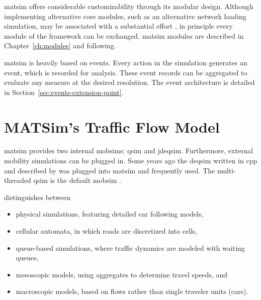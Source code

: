 \gls{matsim} offers considerable customizability through its modular design. Although %
implementing alternative core modules, such as an alternative network loading simulation, may be associated with a substantial effort \citep[][Section 2.4]{MATSim_Userguide_2015}, in principle every module of the framework can be exchanged. \gls{matsim} modules are described in Chapter~\ref{ch:modules} and following.

\gls{matsim} is heavily based on events. Every action in the simulation generates an event, which is recorded for analysis. These event records can be aggregated to evaluate any measure at the desired resolution. The event architecture is detailed in Section~\ref{sec:events-extension-point}.

\section{MATSim's Traffic Flow Model}
\label{sec:trafficflowmodel}
\gls{matsim} provides two internal \glspl{mobsim}: \gls{qsim} and \gls{jdeqsim}. Furthermore, external mobility simulations can be plugged in. Some years ago the \gls{deqsim} written in \gls{cpp} and described by \citet[][]{Charypar_PhDThesis_2008, CharyparEtAl_TRR_2007, CharyparEtAl_TRB_2009, CharyparEtAl_WCTRS_2007} was plugged into \gls{matsim} and frequently used. The multi-threaded \gls{qsim} is the default \gls{mobsim} \citep[][]{MATSim_Userguide_2015}. %

\citet[][]{CharyparEtAl_TRB_2009} distinguishes between 
\begin{itemize}\styleItemize
\item physical simulations, featuring detailed car following models, %
\item cellular automata, in which roads are discretized into cells,
\item queue-based simulations, where traffic dynamics are modeled with waiting queues,
\item mesoscopic models, using aggregates to determine travel speeds, and
\item macroscopic models, based on flows rather than single traveler units (\eg cars).
\end{itemize}

